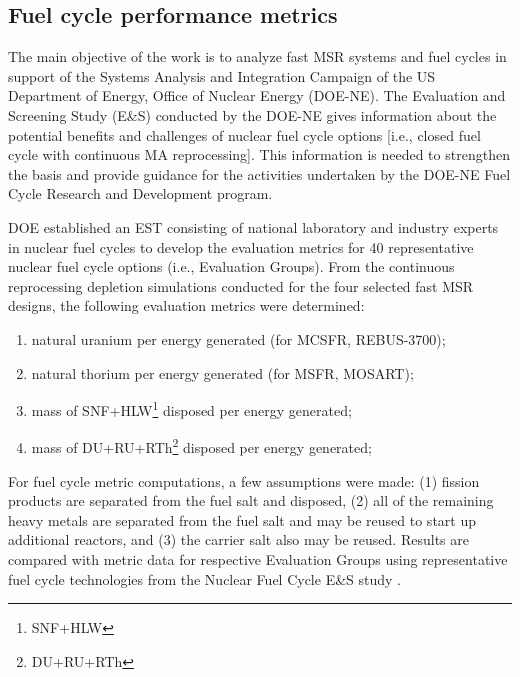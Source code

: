\documentclass[letterpaper]{mandc2019}
\begin{document}
\subsection{Fuel cycle performance metrics}
\label{sec:metrics}
The main objective of the work is to analyze fast \gls{MSR} systems and fuel cycles in support of the Systems Analysis and Integration Campaign of the US Department of Energy, Office of Nuclear Energy (DOE-NE). The Evaluation and Screening Study (E\&S) conducted by the DOE-NE gives information about the potential benefits and challenges of nuclear fuel cycle options [i.e., closed fuel cycle with continuous \gls{MA} reprocessing]. This information is needed to strengthen the basis and provide guidance for the activities undertaken by the DOE-NE Fuel Cycle Research and Development program.

DOE established an \gls{EST} consisting of national laboratory and industry experts in nuclear fuel cycles to develop the evaluation metrics for 40 representative nuclear fuel cycle options (i.e., Evaluation Groups). From the continuous reprocessing depletion simulations conducted for the four selected fast \gls{MSR} designs, the following evaluation metrics were determined:
\vspace{-0.4in}
\begin{enumerate}
	\item natural uranium per energy generated (for \gls{MCSFR}, REBUS-3700);\vspace{-0.11in}
	\item natural thorium per energy generated (for \gls{MSFR}, \gls{MOSART});\vspace{-0.11in}
	\item mass of SNF+HLW\footnote{\gls{SNF}+\gls{HLW}} disposed per energy generated;\vspace{-0.11in}
	\item mass of DU+RU+RTh\footnote{\gls{DU}+\gls{RU}+\gls{RTh}} disposed per energy  generated;\vspace{-0.18in}
\end{enumerate}
For fuel cycle metric computations, a few assumptions were made:
(1) fission products are separated from the fuel salt and disposed,
(2) all of the remaining heavy metals are separated from the fuel salt and may be reused to start up additional reactors, and
(3) the carrier salt also may be reused.
Results are compared with metric data for respective Evaluation Groups using representative fuel cycle technologies from the Nuclear Fuel Cycle E\&S study \cite{wigeland_nuclear_2014-4}.
\end{document}
